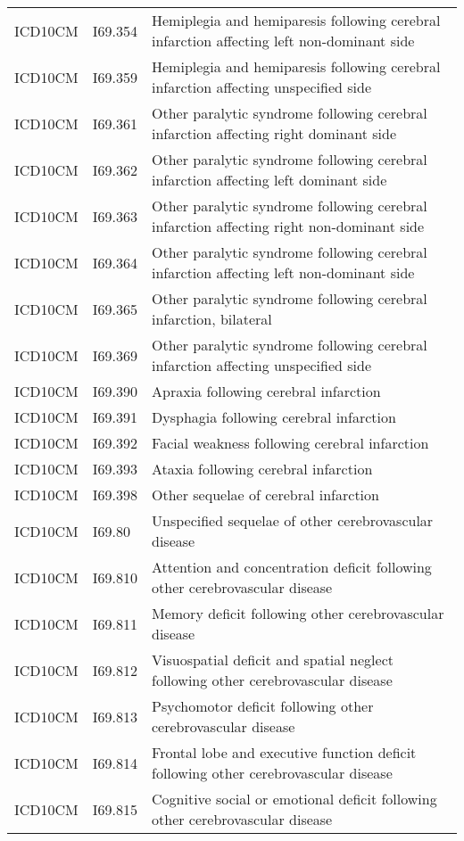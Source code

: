\begin{longtable}{p{}p{}p{}}
  ICD10CM & I69.354 & Hemiplegia and hemiparesis following cerebral infarction affecting left non-dominant side \\ 
  ICD10CM & I69.359 & Hemiplegia and hemiparesis following cerebral infarction affecting unspecified side \\ 
  ICD10CM & I69.361 & Other paralytic syndrome following cerebral infarction affecting right dominant side \\ 
  ICD10CM & I69.362 & Other paralytic syndrome following cerebral infarction affecting left dominant side \\ 
  ICD10CM & I69.363 & Other paralytic syndrome following cerebral infarction affecting right non-dominant side \\ 
  ICD10CM & I69.364 & Other paralytic syndrome following cerebral infarction affecting left non-dominant side \\ 
  ICD10CM & I69.365 & Other paralytic syndrome following cerebral infarction, bilateral \\ 
  ICD10CM & I69.369 & Other paralytic syndrome following cerebral infarction affecting unspecified side \\ 
  ICD10CM & I69.390 & Apraxia following cerebral infarction \\ 
  ICD10CM & I69.391 & Dysphagia following cerebral infarction \\ 
  ICD10CM & I69.392 & Facial weakness following cerebral infarction \\ 
  ICD10CM & I69.393 & Ataxia following cerebral infarction \\ 
  ICD10CM & I69.398 & Other sequelae of cerebral infarction \\ 
  ICD10CM & I69.80 & Unspecified sequelae of other cerebrovascular disease \\ 
  ICD10CM & I69.810 & Attention and concentration deficit following other cerebrovascular disease \\ 
  ICD10CM & I69.811 & Memory deficit following other cerebrovascular disease \\ 
  ICD10CM & I69.812 & Visuospatial deficit and spatial neglect following other cerebrovascular disease \\ 
  ICD10CM & I69.813 & Psychomotor deficit following other cerebrovascular disease \\ 
  ICD10CM & I69.814 & Frontal lobe and executive function deficit following other cerebrovascular disease \\ 
  ICD10CM & I69.815 & Cognitive social or emotional deficit following other cerebrovascular disease \\ 

\end{longtable}

